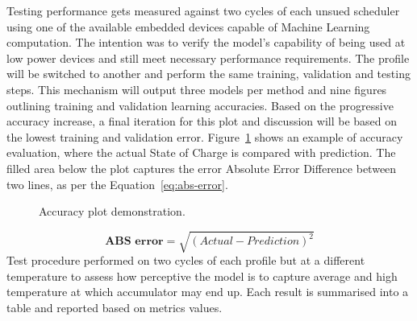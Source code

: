 %
Testing performance gets measured against two cycles of each unsued scheduler using one of the available embedded devices capable of Machine Learning computation.
The intention was to verify the model's capability of being used at low power devices and still meet necessary performance requirements.
The profile will be switched to another and perform the same training, validation and testing steps.
This mechanism will output three models per method and nine figures outlining training and validation learning accuracies.
Based on the progressive accuracy increase, a final iteration for this plot and discussion will be based on the lowest training and validation error.
Figure~\ref{fig:plot_demo} shows an example of accuracy evaluation, where the actual State of Charge is compared with prediction.
The filled area below the plot captures the error Absolute Error Difference between two lines, as per the Equation~\ref{eq:abs-error}.
\begin{figure}[ht]
    \centering
    
    \caption{Accuracy plot demonstration.}
    \label{fig:plot_demo}
\end{figure}
\begin{equation}
    \textbf{ABS error}  = \sqrt{(Actual-Prediction)^2}
    \label{eq:abs-error}
\end{equation}
Test procedure performed on two cycles of each profile but at a different temperature to assess how perceptive the model is to capture average and high temperature at which accumulator may end up.
Each result is summarised into a table and reported based on metrics values.
%
%
%

